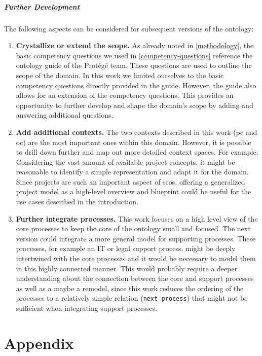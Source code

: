 \documentclass[a4paper, DIV=13, BCOR=0cm]{scrbook}
\newcommand{\relation}[1]{\texttt{#1}}
\begin{document}
\paragraph{Further Development}
The following aspects can be considered for subsequent versions of the ontology:
\begin{enumerate}
	\item \textbf{Crystallize or extend the scope.} As already noted in \autoref{methodology}, the basic competency questions we used in \autoref{competency-questions} reference the ontology guide of the Protégé team. These questions are used to outline the scope of the domain. In this work we limited ourselves to the basic competency questions directly provided in the guide. However, the guide also allows for an extension of the competency questions. This provides an opportunity to further develop and shape the domain's scope by adding and answering additional questions. 
	\item \textbf{Add additional contexts.} The two contexts described in this work (\gls{pc} and \gls{oc}) are the most important ones within this domain. However, it is possible to drill down further and map out more detailed context spaces. For example: Considering the vast amount of available project concepts, it might be reasonable to identify a simple representation and adapt it for the domain. Since projects are such an important aspect of \glspl{sco}, offering a generalized project model as a high-level overview and blueprint could be useful for the use cases described in the introduction.
	\item \textbf{Further integrate processes.} This work focuses on a high level view of the core processes to keep the core of the ontology small and focused. The next version could integrate a more general model for supporting processes. These processes, for example an IT or legal support process, might be deeply intertwined with the core processes and it would be necessary to model them in this highly connected manner. This would probably require a deeper understanding about the connection between the core and support processes as well as a maybe a remodel, since this work reduces the ordering of the processes to a relatively simple relation (\relation{next\_process}) that might not be sufficient when integrating support processes.

\end{enumerate}

\appendix
\chapter{Appendix}
\printbibliography
\clearpage
\end{document}
